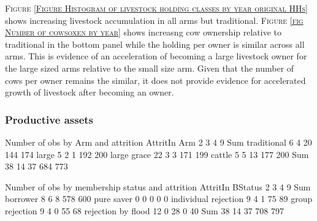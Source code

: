 \begin{palepinkleftbar}
\begin{finding}
\textsc{Figure \ref{Figure Histogram of livestock holding classes by year original HHs}} shows increasing livestock accumulation in all arms but \textsf{traditional}. 
\textsc{Figure \ref{fig Number of cowsoxen by year}} shows increasng cow ownership relative to \textsf{traditional} in the bottom panel while the holding per owner is similar across all arms. This is evidence of an acceleration of becoming a large livestock owner for the large sized arms relative to the small size arm. Given that the number of cows per owner remains the similar, it does not provide evidence for accelerated growth of livestock after becoming an owner.
\end{finding}
\end{palepinkleftbar}




\subsubsection{Productive assets}



\begin{Schunk}
\begin{Soutput}


Number of obs by Arm and attrition
             AttritIn
Arm             2   3   4   9 Sum
  traditional   6   4  20 144 174
  large         5   2   1 192 200
  large grace  22   3   3 171 199
  cattle        5   5  13 177 200
  Sum          38  14  37 684 773


Number of obs by membership status and attrition
                      AttritIn
BStatus                  2   3   4   9 Sum
  borrower               8   6   8 578 600
  pure saver             0   0   0   0   0
  individual rejection   9   4   1  75  89
  group rejection        9   4   0  55  68
  rejection by flood    12   0  28   0  40
  Sum                   38  14  37 708 797
\end{Soutput}
\end{Schunk}











